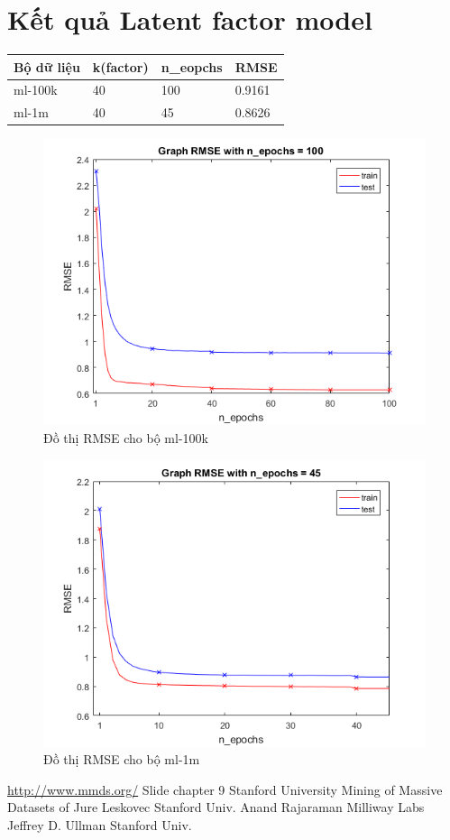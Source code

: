 \documentclass[a4paper,11pt]{report}
\begin{document}
\section{Kết quả Latent factor model}
\begin{center}
\begin{longtable}{|l|l|l|l|}
\hline
Bộ dữ liệu & k(factor) & n\_eopchs & RMSE \\
\hline
ml-100k & 40 & 100 & 0.9161 \\
ml-1m & 40 & 45 & 0.8626 \\
\hline
\end{longtable}
\end{center}
\begin{center}
\begin{figure}[h]
\includegraphics[scale=1]{RMSE.png}
\caption{Đồ thị RMSE cho bộ ml-100k}
\end{figure}
\end{center}
\begin{center}
\begin{figure}[h]
\includegraphics[scale=1]{RMSE!.png}
\caption{Đồ thị RMSE cho bộ ml-1m}
\end{figure}
\end{center}
\begin{thebibliography}{5}
\url{http://www.mmds.org/}
Slide chapter 9 Stanford University
Mining of Massive Datasets of Jure Leskovec Stanford Univ. Anand Rajaraman Milliway Labs Jeffrey D. Ullman Stanford Univ.
\end{thebibliography}
\end{document}
